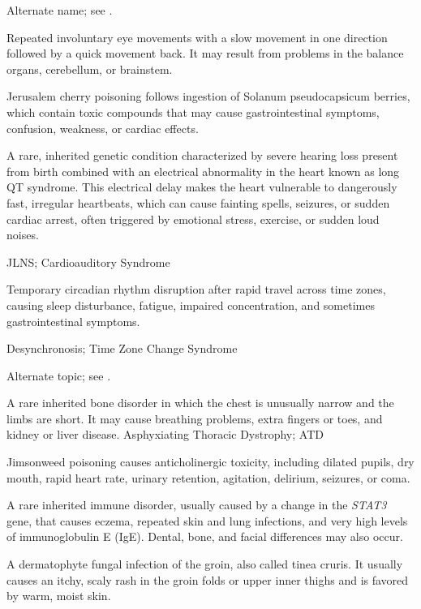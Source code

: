  Alternate name; see .

 Repeated involuntary eye movements with a slow movement in one direction followed by a quick movement back. It may result from problems in the balance organs, cerebellum, or brainstem.

 Jerusalem cherry poisoning follows ingestion of Solanum pseudocapsicum berries, which contain toxic compounds that may cause gastrointestinal symptoms, confusion, weakness, or cardiac effects.

 A rare, inherited genetic condition characterized by severe hearing loss present from birth combined with an electrical abnormality in the heart known as long QT syndrome. This electrical delay makes the heart vulnerable to dangerously fast, irregular heartbeats, which can cause fainting spells, seizures, or sudden cardiac arrest, often triggered by emotional stress, exercise, or sudden loud noises.

\synonyms
JLNS; Cardioauditory Syndrome

 Temporary circadian rhythm disruption after rapid travel across time zones, causing sleep disturbance, fatigue, impaired concentration, and sometimes gastrointestinal symptoms.

\synonyms
Desynchronosis; Time Zone Change Syndrome

 Alternate topic; see .

 A rare inherited bone disorder in which the chest is unusually narrow and the limbs are short. It may cause breathing problems, extra fingers or toes, and kidney or liver disease.
\synonyms
Asphyxiating Thoracic Dystrophy; ATD

 Jimsonweed poisoning causes anticholinergic toxicity, including dilated pupils, dry mouth, rapid heart rate, urinary retention, agitation, delirium, seizures, or coma.

 A rare inherited immune disorder, usually caused by a change in the \textit{STAT3} gene, that causes eczema, repeated skin and lung infections, and very high levels of immunoglobulin E (IgE). Dental, bone, and facial differences may also occur.

 A dermatophyte fungal infection of the groin, also called tinea cruris. It usually causes an itchy, scaly rash in the groin folds or upper inner thighs and is favored by warm, moist skin.

